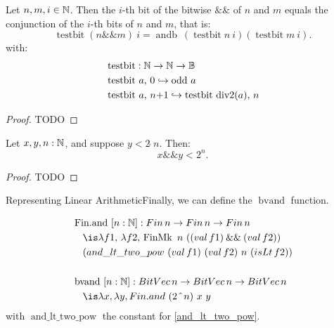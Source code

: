 \begin{lemma}
Let $n, m, i \in \mathbb{N}$. Then the $i$-th bit of the bitwise $\mathbin{\&\&}$ of $n$ and $m$ equals the conjunction of the $i$-th bits of $n$ and $m$, that is:
\[
\mathop{testbit} (n \mathbin{\&\&} m)~i = \mathop{andb}~(\mathop{testbit} n~i) (\mathop{testbit} m~i).
\]
with:
\begin{align*}
&\mathop{\mathrm{testbit}} : \mathbb{N} \rightarrow \mathbb{N} \rightarrow \mathbb{B} \\
&\mathop{\mathrm{testbit}}\,a,\,0 \hookrightarrow \mathop{\mathrm{odd}}\,a \\
&\mathop{\mathrm{testbit}}\,a,\,n{+}1 \hookrightarrow \mathop{\mathrm{testbit}}\,\mathop{\mathrm{div2}}(a),\, n
\end{align*}
\begin{proof}TODO\end{proof}
\label{lem:correct-land}
\end{lemma}

\begin{lemma}
Let \( x, y, n : \mathbb{N} \), and suppose \( y < 2 \,\hat{}\, n \). Then:
\[
x \mathbin{\&\&} y < 2^n.
\]
\label{and_lt_two_pow}
\begin{proof} TODO \end{proof}
\end{lemma}

Representing Linear ArithmeticFinally, we can define the $\mathop{bvand}$ function.

\begin{definition}
\begin{align*}
&\mathop{\mathrm{Fin.and}}~[n: \N]: \mathop{Fin} n \ra \mathop{Fin} n \ra \mathop{Fin} n\\
&\quad\is \lambda f1,\, \lambda f2,\, \mathop{\mathrm{FinMk}}~n~((\mathop{val} f1) \mathbin{\&\&} (\mathop{val} f2)) \\
&\quad (\mathop{and\_lt\_two\_pow}~(\mathop{val} f1)~(\mathop{val} f2)~n~(\mathop{isLt} f2)) \\
&\\
&\mathop{\mathrm{bvand}}~[n: \N]: \mathop{BitVec} n \ra \mathop{BitVec} n \ra \mathop{BitVec} n\\
&\quad\is \lambda x, \lambda y, \mathop{Fin.and}~(2~\hat{}~n)~x~y
\end{align*}
with $\mathop{and\_lt\_two\_pow}$ the constant for \cref{and_lt_two_pow}.
\end{definition}